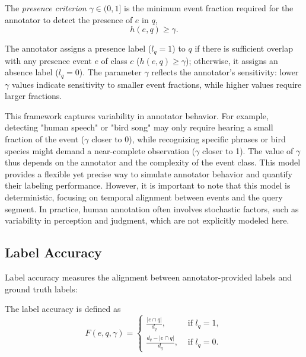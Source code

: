 \begin{definition}
\label{def:annotator_criterion}
The \textit{presence criterion} \( \gamma \in (0, 1] \) is the minimum event fraction required for the annotator to detect the presence of \( e \) in \( q \),
\begin{equation}
\label{eq:annotator_criterion}
    h(e, q) \geq \gamma.
\end{equation}
\end{definition}


The annotator assigns a presence label (\(l_q = 1\)) to \( q \) if there is sufficient overlap with any presence event $e$ of class $c$ (\( h(e, q) \geq \gamma \)); otherwise, it assigns an absence label (\(l_q=0\)). The parameter \( \gamma \) reflects the annotator's sensitivity: lower \( \gamma \) values indicate sensitivity to smaller event fractions, while higher values require larger fractions. 

This framework captures variability in annotator behavior. For example, detecting "human speech" or "bird song" may only require hearing a small fraction of the event (\( \gamma \) closer to 0), while recognizing specific phrases or bird species might demand a near-complete observation (\( \gamma \) closer to 1). The value of \( \gamma \) thus depends on the annotator and the complexity of the event class. This model provides a flexible yet precise way to simulate annotator behavior and quantify their labeling performance. However, it is important to note that this model is deterministic, focusing on temporal alignment between events and the query segment. In practice, human annotation often involves stochastic factors, such as variability in perception and judgment, which are not explicitly modeled here.


\subsection{Label Accuracy}
\label{sec:quality_of_presence_labels}

Label accuracy measures the alignment between annotator-provided labels and ground truth labels:

\begin{definition}
The label accuracy is defined as 
\begin{equation}
\label{eq:query_iou}
    F(e, q, \gamma) = \begin{cases}
        \frac{|e \cap q|}{d_q}, & \text{ if } l_q = 1, \\
        \frac{d_q - |e \cap q|}{d_q}, & \text{ if } l_q = 0.
    \end{cases}
\end{equation}
\end{definition}

